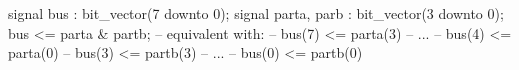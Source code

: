 signal bus : bit_vector(7 downto 0);
signal parta, parb : bit_vector(3 downto 0);
bus <= parta & partb;
-- equivalent with:
-- bus(7) <= parta(3)
-- ...
-- bus(4) <= parta(0)
-- bus(3) <= partb(3)
-- ...
-- bus(0) <= partb(0)